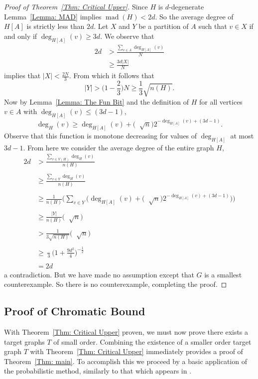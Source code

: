 \documentclass[11pt]{article}
\theoremstyle{definition}
\DeclareMathOperator{\mad}{\text{mad}}
\DeclareMathOperator{\coe}{6\Big(1+\frac{9d^2}{4}\Big)^{\frac{1}{2}}d}
\begin{document}
\begin{proof}[Proof of Theorem~\ref{Thm: Critical Upper}]
Since $H$ is $d$-degenerate Lemma~\ref{Lemma: MAD} implies
$\mad(H) < 2d$. So the average degree of $H[A]$ is strictly less than $2d$.
Let $X$ and $Y$ be a partition of $A$ such that $v \in X$
if and only if $\deg_{H[A]}(v)\geq 3d$.
We observe that
\begin{align*}
    2d &> \frac{\sum_{v \in A} \deg_{H[A]}(v)}{N} \\
    & \geq \frac{3d|X|}{N}
\end{align*}
implies that $|X| < \frac{2N}{3}$. From which it follows that 
\[
|Y| > \Big(1-\frac{2}{3}\Big)N\geq  \frac{1}{3}\sqrt{n(H)}.
\]
Now
by Lemma~\ref{Lemma: The Fun Bit} and the definition of $H$ for all vertices $v \in A$ with $\deg_{H[A]}(v) \leq (3d-1)$,
\[
\deg_H(v) \geq  \deg_{H[A]}(v) + \Big( \coe \sqrt{n}\Big)2^{-\deg_{H[A]}(v)+(3d-1)}.
\]
Observe that this function is monotone decreasing for values of $\deg_{H[A]}$ at most $3d-1$.
From here we consider the average degree of the entire graph $H$,
\begin{align*}
    2d &> \frac{\sum_{v \in V(H)} \deg_{H}(v)}{n(H)} \\
    \\
    & \geq \frac{\sum_{v \in Y} \deg_{H}(v)}{n(H)} \\
    \\
    & \geq \frac{1}{n(H)} \Bigg(\sum_{v\in Y} \Big(\deg_{H[A]}(v) + \Big(\coe\sqrt{n}\Big)2^{-\deg_{H[A]}(v)+(3d-1)}\Big)\Bigg) \\
    \\
    &\geq \frac{|Y|}{n(H)}\Bigg(\coe\sqrt{n} \Bigg)  \\
    \\ 
    &>\frac{1}{3\sqrt{n(H)}}\Bigg(\coe\sqrt{n} \Bigg) \\
    \\
    & \geq \frac{\coe }{3} \Bigg(1+\frac{9d^2}{4}\Bigg)^{-\frac{1}{2}}\\
    \\
    & = 2d
\end{align*}
a contradiction. But we have made no assumption except that $G$ is a smallest counterexample.
So there is no counterexample, completing the proof.
\end{proof}



\subsection{Proof of Chromatic Bound}

With Theorem~\ref{Thm: Critical Upper} proven,
we must now prove there exists a target graphs $T$ of small order.
Combining the existence of a smaller order target graph $T$ with Theorem~\ref{Thm: Critical Upper}
immediately provides a proof of Theorem~\ref{Thm: main}.
To accomplish this we proceed by a basic application of the probabilistic method,
similarly to that which appears in \cite{CLOW2026}.
\end{document}
